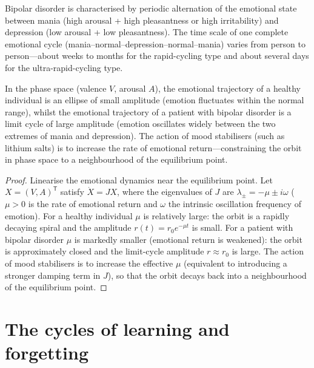 \begin{proposition}\label{prop:bipolar_cycle}
Bipolar disorder is characterised by periodic alternation of the emotional state between mania (high arousal + high pleasantness or high irritability) and depression (low arousal + low pleasantness). The time scale of one complete emotional cycle (mania--normal--depression--normal--mania) varies from person to person---about weeks to months for the rapid-cycling type and about several days for the ultra-rapid-cycling type.

In the phase space (valence $V$, arousal $A$), the emotional trajectory of a healthy individual is an ellipse of small amplitude (emotion fluctuates within the normal range), whilst the emotional trajectory of a patient with bipolar disorder is a limit cycle of large amplitude (emotion oscillates widely between the two extremes of mania and depression). The action of mood stabilisers (such as lithium salts) is to increase the rate of emotional return---constraining the orbit in phase space to a neighbourhood of the equilibrium point.
\end{proposition}

\begin{proof}
Linearise the emotional dynamics near the equilibrium point. Let $X = (V, A)^{\mathsf T}$ satisfy $\dot X = J X$, where the eigenvalues of $J$ are $\lambda_{\pm} = -\mu \pm i\omega$ ($\mu > 0$ is the rate of emotional return and $\omega$ the intrinsic oscillation frequency of emotion). For a healthy individual $\mu$ is relatively large: the orbit is a rapidly decaying spiral and the amplitude $r(t) = r_0 e^{-\mu t}$ is small. For a patient with bipolar disorder $\mu$ is markedly smaller (emotional return is weakened): the orbit is approximately closed and the limit-cycle amplitude $r \approx r_0$ is large. The action of mood stabilisers is to increase the effective $\mu$ (equivalent to introducing a stronger damping term in $J$), so that the orbit decays back into a neighbourhood of the equilibrium point.
\end{proof}

\section{The cycles of learning and forgetting}


